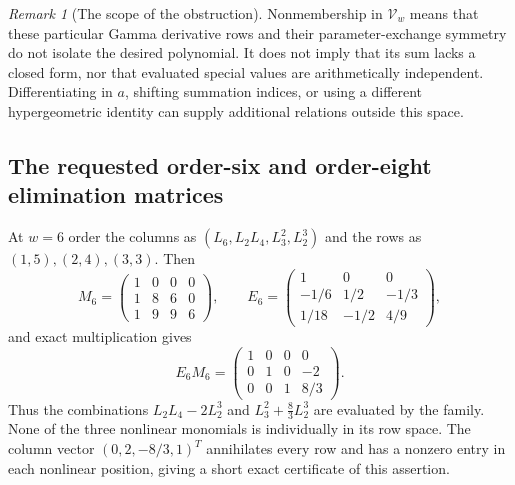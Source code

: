 \documentclass[11pt,a4paper]{article}
\numberwithin{equation}{section}
\theoremstyle{definition}
\theoremstyle{remark}
\newtheorem{remark}[theorem]{Remark}
\begin{document}
\begin{remark}[The scope of the obstruction]
Nonmembership in $\mathcal V_w$ means that these particular Gamma
derivative rows and their parameter-exchange symmetry do not isolate
the desired polynomial. It does not imply that its sum lacks a closed
form, nor that evaluated special values are arithmetically independent.
Differentiating in $a$, shifting summation indices, or using a different
hypergeometric identity can supply additional relations outside this space.
\end{remark}

\subsection{The requested order-six and order-eight elimination matrices}

At $w=6$ order the columns as
$(L_6,L_2L_4,L_3^2,L_2^3)$ and the rows as $(1,5),(2,4),(3,3)$.
Then
\begin{equation}
 M_6=\begin{pmatrix}1&0&0&0\\1&8&6&0\\1&9&9&6\end{pmatrix},\qquad
 E_6=\begin{pmatrix}1&0&0\\-1/6&1/2&-1/3\\1/18&-1/2&4/9\end{pmatrix},
 \label{bell:sixmatrix}
\end{equation}
and exact multiplication gives
\begin{equation}
 E_6M_6=\begin{pmatrix}1&0&0&0\\0&1&0&-2\\0&0&1&8/3\end{pmatrix}.
 \label{bell:sixrref}
\end{equation}
Thus the combinations $L_2L_4-2L_2^3$ and
$L_3^2+\tfrac83L_2^3$ are evaluated by the family. None of the three
nonlinear monomials is individually in its row space. The column vector
$(0,2,-8/3,1)^T$ annihilates every row and has a nonzero entry in
each nonlinear position, giving a short exact certificate of this assertion.
\end{document}
